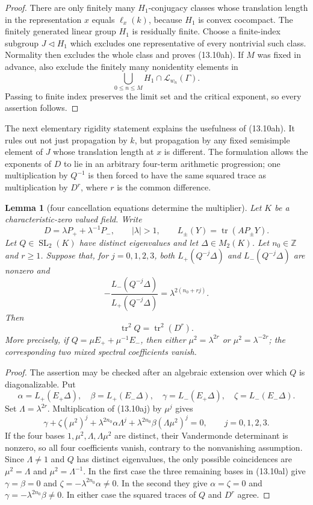 \documentclass[11pt,reqno]{amsart}
\newtheorem{lemma}[theorem]{Lemma}
\theoremstyle{definition}
\theoremstyle{remark}
\newcommand{\Z}{\mathbb Z}
\newcommand{\Tr}{\operatorname{tr}}
\newcommand{\SL}{\operatorname{SL}}
\begin{document}
\begin{proof}
There are only finitely many \(H_1\)-conjugacy classes whose translation
length in the representation \(x\) equals \(\ell_x(k)\), because \(H_1\) is convex
cocompact.  The finitely generated linear group \(H_1\) is residually
finite.  Choose a finite-index subgroup \(J\triangleleft H_1\) which
excludes one representative of every nontrivial such class.  Normality
then excludes the whole class and proves (13.10ah).  If \(M\) was fixed in
advance, also exclude the finitely many nonidentity elements in
\[
 \bigcup_{0\le n\le M}
 H_1\cap\mathcal L_{w_n}(\Gamma).
\]
Passing to finite index preserves the limit set and the critical exponent,
so every assertion follows.
\end{proof}

The next elementary rigidity statement explains the usefulness of
(13.10ah).  It rules out not just propagation by \(k\), but propagation by
any fixed semisimple element of \(J\) whose translation length at \(x\) is different.
The formulation allows the exponents of \(D\) to lie in an arbitrary
four-term arithmetic progression; one multiplication by \(Q^{-1}\) is then
forced to have the same squared trace as multiplication by \(D^r\), where
\(r\) is the common difference.

\begin{lemma}[four cancellation equations determine the multiplier]
\label{lem:coherent-resonance-rigidity}
Let \(K\) be a characteristic-zero valued field.  Write
\[
 D=\lambda P_++\lambda^{-1}P_-,\qquad |\lambda|>1,
 \qquad L_\pm(Y)=\Tr(AP_\pm Y).
\]
Let \(Q\in\SL_2(K)\) have distinct eigenvalues and let
\(\Delta\in M_2(K)\).  Let \(n_0\in\Z\) and \(r\ge1\).  Suppose that,
for \(j=0,1,2,3\), both \(L_+(Q^{-j}\Delta)\) and
\(L_-(Q^{-j}\Delta)\) are nonzero and
\[
 -\frac{L_-(Q^{-j}\Delta)}{L_+(Q^{-j}\Delta)}
   =\lambda^{2(n_0+rj)}.
\tag{13.10aj}
\]
Then
\[
 \Tr^2Q=\Tr^2(D^r).
\tag{13.10ak}
\]
More precisely, if
\(Q=\mu E_++\mu^{-1}E_-\), then either
\(\mu^2=\lambda^{2r}\) or \(\mu^2=\lambda^{-2r}\); the corresponding two
mixed spectral coefficients vanish.
\end{lemma}

\begin{proof}
The assertion may be checked after an algebraic extension over which \(Q\)
is diagonalizable.  Put
\[
 \alpha=L_+(E_+\Delta),\quad \beta=L_+(E_-\Delta),\quad
 \gamma=L_-(E_+\Delta),\quad \zeta=L_-(E_-\Delta).
\]
Set \(\Lambda=\lambda^{2r}\).  Multiplication of (13.10aj) by
\(\mu^j\) gives
\[
 \gamma+\zeta(\mu^2)^j
 +\lambda^{2n_0}\alpha\Lambda^j
 +\lambda^{2n_0}\beta(\Lambda\mu^2)^j=0,
 \qquad j=0,1,2,3.
\tag{13.10al}
\]
If the four bases
\(1,\mu^2,\Lambda,\Lambda\mu^2\) are distinct, their Vandermonde
determinant is nonzero, so all four coefficients vanish, contrary to the
nonvanishing assumption.  Since \(\Lambda\ne1\) and \(Q\) has distinct
eigenvalues, the only possible coincidences are
\(\mu^2=\Lambda\) and \(\mu^2=\Lambda^{-1}\).  In the first case the
three remaining bases in (13.10al) give
\(\gamma=\beta=0\) and
\(\zeta=-\lambda^{2n_0}\alpha\ne0\).  In the second they give
\(\alpha=\zeta=0\) and
\(\gamma=-\lambda^{2n_0}\beta\ne0\).  In either case the
squared traces of \(Q\) and \(D^r\) agree.
\end{proof}
\end{document}
